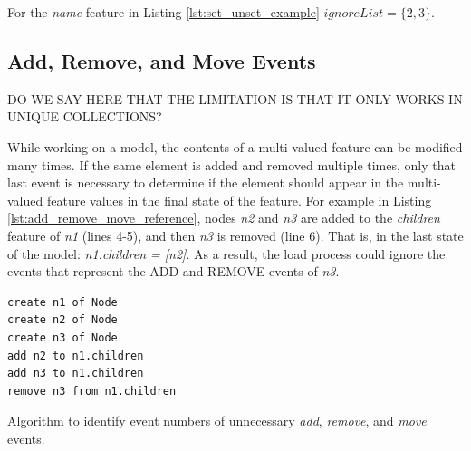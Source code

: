 \documentclass{llncs}
\begin{document}
For the \emph{name} feature in Listing \ref{lst:set_unset_example} $ignoreList = \{2, 3\}$.

\subsection{Add, Remove, and Move Events}\label{subsec:add_remove_and_move_operations}
DO WE SAY HERE THAT THE LIMITATION IS THAT IT ONLY WORKS IN UNIQUE COLLECTIONS?

While working on a model, the contents of a multi-valued feature can be modified many times.
If the same element is added and removed multiple times,  only that last event is necessary to determine if the element should appear in the multi-valued feature values in the final state of the feature.
For example in Listing \ref{lst:add_remove_move_reference},  nodes \emph{n2} and \emph{n3} are added to the \emph{children} feature of \emph{n1} (lines 4-5), and then \emph{n3} is removed (line 6).
That is, in the last state of the model: \emph{n1.children = [n2]}.
As a result, the load process could ignore the events that represent the ADD and REMOVE events of \emph{n3}.

\begin{lstlisting}[style=eol,caption={Example of CBP representation of attribute \emph{values}'s add and remove operations.},label=lst:add_remove_move_reference]
create n1 of Node
create n2 of Node
create n3 of Node
add n2 to n1.children
add n3 to n1.children
remove n3 from n1.children
\end{lstlisting}

\begin{algorithm}[H]
\begin{small}
\end{small}
\caption{Algorithm to identify event numbers of unnecessary \emph{add}, \emph{remove}, and \emph{move} events.}
\label{alg:add_remove_move_optimisation}
\end{algorithm}
\end{document}
